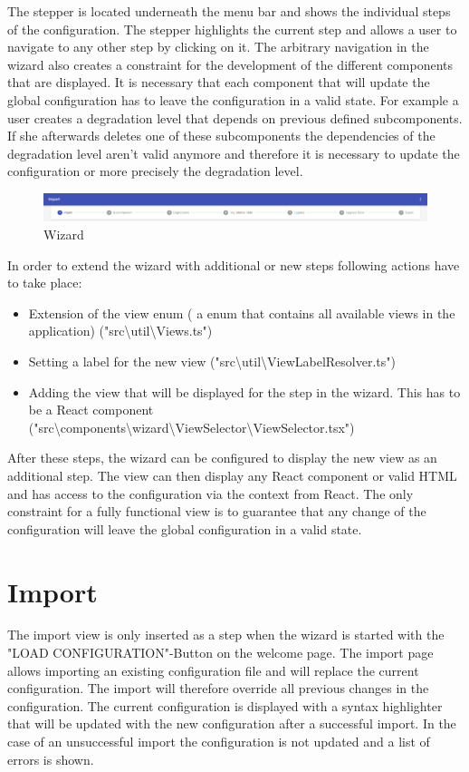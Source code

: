 The stepper is located underneath the menu bar and shows the individual steps of the configuration. The stepper highlights the current step and allows a user to navigate to any other step by clicking on it. The arbitrary navigation in the wizard also creates a constraint for the development of the different components that are displayed. It is necessary that each component that will update the global configuration has to leave the configuration in a valid state. For example a user creates a degradation level that depends on previous defined subcomponents. If she afterwards deletes one of these subcomponents the dependencies of the degradation level aren't valid anymore and therefore it is necessary to update the configuration or more precisely the degradation level. 

\begin{figure}[ht]
    \centering
    \includegraphics[width=\textwidth]{img/wizard.png}
    \caption{Wizard}
    \label{fig:wizard}
\end{figure}

\noindent In order to extend the wizard with additional or new steps following actions have to take place:

\begin{itemize}
    \item Extension of the view enum ( a enum that contains all available views in the application) ("src\textbackslash util\textbackslash Views.ts")
    \item Setting a label for the new view ("src\textbackslash util\textbackslash ViewLabelResolver.ts")
    \item Adding the view that will be displayed for the step in the wizard. This has to be a React component ("src\textbackslash components\textbackslash wizard\textbackslash ViewSelector\textbackslash ViewSelector.tsx")
\end{itemize}

\noindent After these steps, the wizard can be configured to display the new view as an additional step. The view can then display any React component or valid HTML and has access to the configuration via the context from React. The only constraint for a fully functional view is to guarantee that any change of the configuration will leave the global configuration in a valid state.

\section{Import}
The import view is only inserted as a step when the wizard is started with the "LOAD CONFIGURATION"-Button on the welcome page. The import page allows importing an existing configuration file and will replace the current configuration. The import will therefore override all previous changes in the configuration. The current configuration is displayed with a syntax highlighter that will be updated with the new configuration after a successful import. In the case of an unsuccessful import the configuration is not updated and a list of errors is shown.

